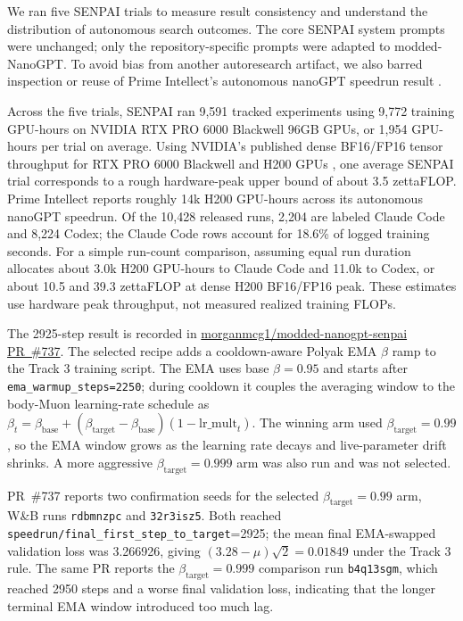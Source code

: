 \documentclass{article}
\begin{document}
We ran five SENPAI trials to measure result consistency and understand the distribution of autonomous search outcomes. The core SENPAI system prompts were unchanged; only the repository-specific prompts were adapted to modded-NanoGPT. To avoid bias from another autoresearch artifact, we also barred inspection or reuse of Prime Intellect's autonomous nanoGPT speedrun result \citep{primeintellect2026autonanogpt}.

Across the five trials, SENPAI ran 9,591 tracked experiments using 9,772 training GPU-hours on NVIDIA RTX PRO 6000 Blackwell 96GB GPUs, or 1,954 GPU-hours per trial on average. Using NVIDIA's published dense BF16/FP16 tensor throughput for RTX PRO 6000 Blackwell and H200 GPUs \citep{nvidia2025rtxpro6000blackwell,nvidia2026h200}, one average SENPAI trial corresponds to a rough hardware-peak upper bound of about 3.5 zettaFLOP. Prime Intellect reports roughly 14k H200 GPU-hours across its autonomous nanoGPT speedrun. Of the 10,428 released runs, 2,204 are labeled Claude Code and 8,224 Codex; the Claude Code rows account for 18.6\% of logged training seconds. For a simple run-count comparison, assuming equal run duration allocates about 3.0k H200 GPU-hours to Claude Code and 11.0k to Codex, or about 10.5 and 39.3 zettaFLOP at dense H200 BF16/FP16 peak. These estimates use hardware peak throughput, not measured realized training FLOPs.

The 2925-step result is recorded in \href{https://github.com/morganmcg1/modded-nanogpt-senpai/pull/737}{morganmcg1/modded-nanogpt-senpai PR~\#737}. The selected recipe adds a cooldown-aware Polyak EMA $\beta$ ramp to the Track 3 training script. The EMA uses base $\beta=0.95$ and starts after \texttt{ema\_warmup\_steps=2250}; during cooldown it couples the averaging window to the body-Muon learning-rate schedule as $\beta_t=\beta_{\mathrm{base}}+(\beta_{\mathrm{target}}-\beta_{\mathrm{base}})(1-\mathrm{lr\_mult}_t)$. The winning arm used $\beta_{\mathrm{target}}=0.99$, so the EMA window grows as the learning rate decays and live-parameter drift shrinks. A more aggressive $\beta_{\mathrm{target}}=0.999$ arm was also run and was not selected.

PR~\#737 reports two confirmation seeds for the selected $\beta_{\mathrm{target}}=0.99$ arm, W\&B runs \texttt{rdbmnzpc} and \texttt{32r3isz5}. Both reached \texttt{speedrun/final\_first\_step\_to\_target}=2925; the mean final EMA-swapped validation loss was 3.266926, giving $(3.28-\mu)\sqrt{2}=0.01849$ under the Track 3 rule. The same PR reports the $\beta_{\mathrm{target}}=0.999$ comparison run \texttt{b4q13sgm}, which reached 2950 steps and a worse final validation loss, indicating that the longer terminal EMA window introduced too much lag.
\end{document}
